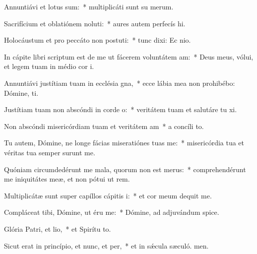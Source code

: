 \item Annuntiávi et lotus sum:~* multiplicáti sunt su merum.
\item Sacrifícium et oblatiónem noluti:~* aures autem perfecís hi.
\item Holocáustum et pro peccáto non postuti:~* tunc dixi: Ec nio.
\item In cápite libri scriptum est de me ut fácerem voluntátem am:~* Deus meus, vólui, et legem tuam in médio cor i.
\item Annuntiávi justítiam tuam in ecclésia gna,~* ecce lábia mea non prohibébo: Dómine,  ti.
\item Justítiam tuam non abscóndi in corde o:~* veritátem tuam et salutáre tu xi.
\item Non abscóndi misericórdiam tuam et veritátem am~* a concíli to.
\item Tu autem, Dómine, ne longe fácias miseratiónes tuas  me:~* misericórdia tua et véritas tua semper surunt me.
\item Quóniam circumdedérunt me mala, quorum non est merus:~* comprehendérunt me iniquitátes meæ, et non pótui ut rem.
\item Multiplicátæ sunt super capíllos cápitis i:~* et cor meum dequit me.
\item Compláceat tibi, Dómine, ut éru me:~* Dómine, ad adjuvándum  spice.
\item Glória Patri, et lio,~* et Spirítu to.
\item Sicut erat in princípio, et nunc, et per,~* et in sǽcula sæculó. men.
